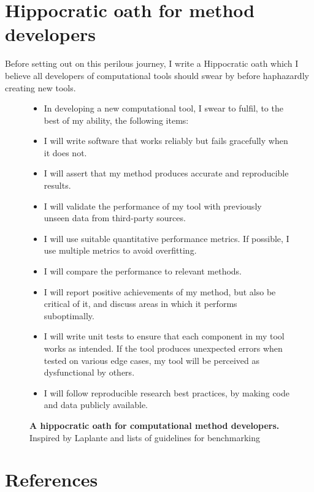 \newpage 
\section{Hippocratic oath for method developers}
Before setting out on this perilous journey, I write a Hippocratic oath 
which I believe all developers of computational tools should swear by 
before haphazardly creating new tools. 

\begin{figure}[htb!]
	\centering
	\begin{tcolorbox}
		\begin{itemize}
			\item In developing a new computational tool, I swear to fulfil, to the best of my ability, the following items:
			\item I will write software that works reliably but fails gracefully when it does not.
			\item I will assert that my method produces accurate and reproducible results.
			\item I will validate the performance of my tool with previously unseen data from third-party sources.
			\item I will use suitable quantitative performance metrics. If possible, I use multiple metrics to avoid overfitting.
			\item I will compare the performance to relevant methods.
			\item I will report positive achievements of my method, but also be critical of it, and discuss areas in which it performs suboptimally.
			\item I will write unit tests to ensure that each component in my tool works as intended. If the tool produces unexpected errors when tested on various edge cases, my tool will be perceived as dysfunctional by others.
			\item I will follow reproducible research best practices, by making code and data publicly available.
		\end{itemize}
	\end{tcolorbox}
	\caption{
		\textbf{A hippocratic oath for computational method developers.} Inspired by Laplante\cite{laplante_firstnoharm_2004} and lists of guidelines for benchmarking\cite{norel_selfassessmenttrapcan_2011,weber_essentialguidelinescomputational_2019}
	}
	\label{fig:hippocratic_oath}
\end{figure}



\clearpage
\section{References}
\printbibliography[heading=none]